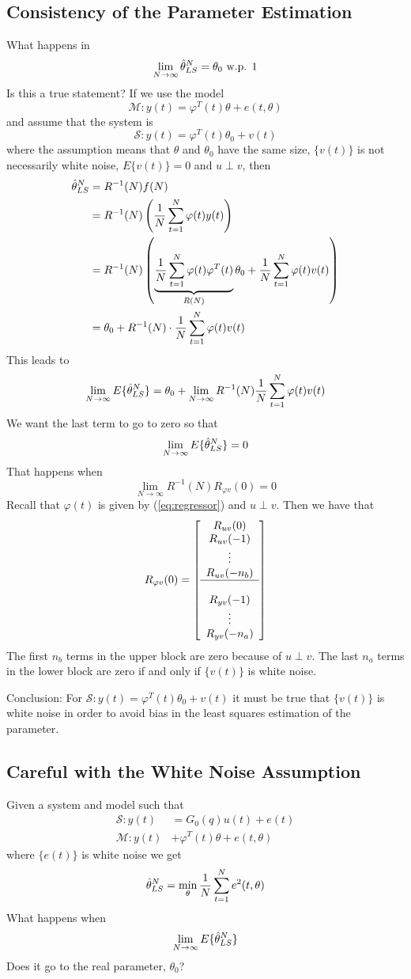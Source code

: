 \documentclass[lecture,12pt,]{pcms-l}
\begin{document}
\subsection{Consistency of the Parameter Estimation}
What happens in
$$\lim_{N\to\infty} \hat{\theta}_{LS}^N  = \theta_0 \text{ w.p. } 1$$
Is this a true statement? If we use the model
$$\mathcal{M}: y(t) = \varphi^T(t)\theta + e(t,\theta)$$
and assume that the system is
$$\mathcal{S}: y(t) = \varphi^T(t)\theta_0 + v(t)$$
where the assumption means that $\theta$ and $\theta_0$ have the same size, $\{v(t)\}$ is not necessarily white noise, $E\{v(t)\} = 0$ and $u\perp v$, then
\begin{align}
\label{eq:thn}
\hat{\theta}_{LS}^N &= R^{-1}(N)f(N) \nonumber \\
&= R^{-1}(N)\left(\frac{1}{N}\sum_{t=1}^N\varphi(t)y(t)\right) \nonumber \\
&= R^{-1}(N)\left( \underbrace{\frac{1}{N}\sum_{t=1}^N\varphi(t)\varphi^T(t)}_{R(N)}\theta_0+\frac{1}{N}\sum_{t=1}^N\varphi(t)v(t)\right) \nonumber\\
&= \theta_0 + R^{-1}(N)\cdot \frac{1}{N}\sum_{t=1}^N\varphi(t)v(t)
\end{align}
This leads to
$$\lim_{N\to\infty} E\{\hat{\theta}_{LS}^N\} = \theta_0 + \lim_{N\to\infty}R^{-1}(N)\frac{1}{N}\sum_{t=1}^N\varphi(t)v(t)$$
We want the last term to go to zero so that
$$\lim_{N\to\infty} E\{\hat{\theta}_{LS}^N\} = 0$$
That happens when
$$\lim_{N\to\infty} R^{-1}(N)R_{\varphi v}(0) = 0$$
Recall that $\varphi(t)$ is given by (\ref{eq:regressor}) and $u\perp v$. Then we have that
$$R_{\varphi v}(0) = \left[\begin{array}{c} R_{uv}(0) \\ R_{uv}(-1) \\ \vdots \\ R_{uv}(-n_b) \\ \hline \\ R_{yv}(-1) \\ \vdots \\ R_{yv}(-n_a) \end{array}\right]$$
The first $n_b$ terms in the upper block are zero because of $u\perp v$. The last $n_a$ terms in the lower block are zero if and only if $\{v(t)\}$ is white noise.

Conclusion: For $\mathcal{S}: y(t) = \varphi^T(t)\theta_0 + v(t)$ it must be true that $\{v(t)\}$ is white noise in order to avoid bias in the least squares estimation of the parameter.

\subsection{Careful with the White Noise Assumption}
Given a system and model such that
\begin{align*}
\mathcal{S}: y(t) &= G_0(q)u(t) + e(t) \\
\mathcal{M}: y(t) &+ \varphi^T(t)\theta + e(t,\theta)
\end{align*}
where $\{e(t)\}$ is white noise we get
$$\hat{\theta}_{LS}^N = \min_\theta \frac{1}{N}\sum_{t=1}^N e^2(t,\theta)$$
What happens when
$$\lim_{N\to\infty} E\{\hat{\theta}_{LS}^N\}$$
Does it go to the real parameter, $\theta_0$?
\end{document}
